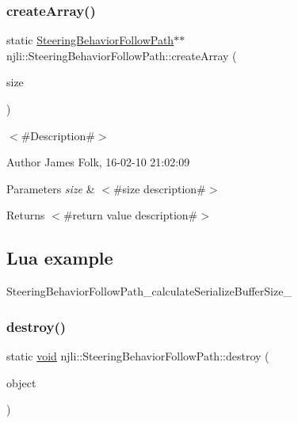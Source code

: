\subsubsection{\texorpdfstring{create\+Array()}{createArray()}}
{\footnotesize\ttfamily static \mbox{\hyperlink{classnjli_1_1_steering_behavior_follow_path}{Steering\+Behavior\+Follow\+Path}}$\ast$$\ast$ njli\+::\+Steering\+Behavior\+Follow\+Path\+::create\+Array (\begin{DoxyParamCaption}\item[{const \mbox{\hyperlink{_util_8h_a10e94b422ef0c20dcdec20d31a1f5049}{u32}}}]{size }\end{DoxyParamCaption})\hspace{0.3cm}{\ttfamily [static]}}



$<$\#\+Description\#$>$ 

\begin{DoxyAuthor}{Author}
James Folk, 16-\/02-\/10 21\+:02\+:09
\end{DoxyAuthor}

\begin{DoxyParams}{Parameters}
{\em size} & $<$\#size description\#$>$\\
\hline
\end{DoxyParams}
\begin{DoxyReturn}{Returns}
$<$\#return value description\#$>$
\end{DoxyReturn}
\hypertarget{classnjli_1_1_steering_behavior_wander_ex1}{}\subsection{Lua example}\label{classnjli_1_1_steering_behavior_wander_ex1}

\begin{DoxyCodeInclude}
\end{DoxyCodeInclude}
Steering\+Behavior\+Follow\+Path\+\_\+calculate\+Serialize\+Buffer\+Size\+\_\+ \mbox{\label{classnjli_1_1_steering_behavior_follow_path_a7f300e1c19fe1dca40bd27d539dcc694}} 
\subsubsection{\texorpdfstring{destroy()}{destroy()}}
{\footnotesize\ttfamily static \mbox{\hyperlink{_thread_8h_af1e856da2e658414cb2456cb6f7ebc66}{void}} njli\+::\+Steering\+Behavior\+Follow\+Path\+::destroy (\begin{DoxyParamCaption}\item[{\mbox{\hyperlink{classnjli_1_1_steering_behavior_follow_path}{Steering\+Behavior\+Follow\+Path}} $\ast$}]{object }\end{DoxyParamCaption})\hspace{0.3cm}{\ttfamily [static]}}



